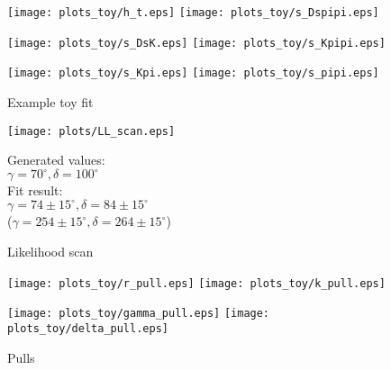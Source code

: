 	
		\begin{figure}[hp]
	\centering
		\texttt{[image: plots\_toy/h\_t.eps]} 
		\texttt{[image: plots\_toy/s\_Dspipi.eps]} 
		
		\texttt{[image: plots\_toy/s\_DsK.eps]} 
		\texttt{[image: plots\_toy/s\_Kpipi.eps]}
		 
		\texttt{[image: plots\_toy/s\_Kpi.eps]} 
		\texttt{[image: plots\_toy/s\_pipi.eps]}
		
		\caption{Example toy fit} 		
	\end{figure}				


	\begin{figure}[hp]
	\centering
		
		
		\texttt{[image: plots/LL\_scan.eps]} 
		
		Generated values: \\  $\gamma = 70^{\circ}, \delta = 100^{\circ}$ \\
		Fit result:    \\ $\gamma = 74 \pm 15^{\circ}, \delta = 84 \pm 15^{\circ}$ \\
		 ($\gamma = 254 \pm 15^{\circ}, \delta = 264 \pm 15^{\circ}$)

		\caption{Likelihood scan} 		

	\end{figure}	


	\begin{figure}[hp]
	\centering
		\texttt{[image: plots\_toy/r\_pull.eps]} 
		\texttt{[image: plots\_toy/k\_pull.eps]} 
		
		\texttt{[image: plots\_toy/gamma\_pull.eps]} 
		\texttt{[image: plots\_toy/delta\_pull.eps]} 

		\caption{Pulls} 		

	\end{figure}	
	

